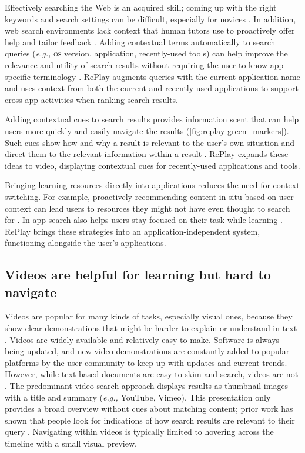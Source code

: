 Effectively searching the Web is an acquired skill; coming up with the right keywords and search settings can be difficult, especially for novices \cite{Russell2011}. In addition, web search environments lack context that human tutors use to proactively offer help and tailor feedback \cite{Schon1983}. Adding contextual terms automatically to search queries (\textit{e.g.,} \textsc{os} version, application, recently-used tools) can help improve the relevance and utility of search results without requiring the user to know app-specific terminology \cite{Ekstrand2011, Brandt2010, Matejka2011a}. RePlay augments queries with the current application name and uses context from both the current and recently-used applications to support cross-app activities when ranking search results.

Adding contextual cues to search results provides information scent that can help users more quickly and easily navigate the results (\autoref{fig:replay-green_markers}). Such cues show how and why a result is relevant to the user's own situation and direct them to the relevant information within a result \cite{Ekstrand2011, Fourney2014}. RePlay expands these ideas to video, displaying contextual cues for recently-used applications and tools.

Bringing learning resources directly into applications reduces the need for context switching. For example, proactively recommending content in-situ based on user context can lead users to resources they might not have even thought to search for \cite{Matejka2009, Fraser2016, Chilana2012, Matejka2011, Ichinco2017}. In-app search also helps users stay focused on their task while learning \cite{Lafreniere2014a, Fraser2016, Chilana2012}. RePlay brings these strategies into an application-independent system, functioning alongside the user's applications.

\subsection{Videos are helpful for learning but hard to navigate}
Videos are popular for many kinds of tasks, especially visual ones, because they show clear demonstrations that might be harder to explain or understand in text \cite{Chi2012, Pongnumkul2011}. Videos are widely available and relatively easy to make. Software is always being updated, and new video demonstrations are constantly added to popular platforms by the user community to keep up with updates and current trends. However, while text-based documents are easy to skim and search, videos are not \cite{Pavel2014, Pavel2015, Kim2014}. The predominant video search approach displays results as thumbnail images with a title and summary (\textit{e.g.,} YouTube, Vimeo). This presentation only provides a broad overview without cues about matching content; prior work has shown that people look for indications of how search results are relevant to their query \cite{Hearst2009}. Navigating within videos is typically limited to hovering across the timeline with a small visual preview.

